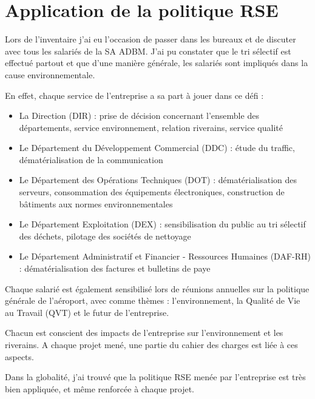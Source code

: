 \section{Application de la politique RSE}

Lors de l'inventaire j'ai eu l'occasion de passer dans les bureaux et de discuter avec tous les salariés de la SA ADBM. J'ai pu constater que le tri sélectif est effectué partout et que d'une manière générale, les salariés sont impliqués dans la cause environnementale.\newline

En effet, chaque service de l'entreprise a sa part à jouer dans ce défi :

\begin{itemize}
    \item La Direction (DIR) : prise de décision concernant l'ensemble des départements, service environnement, relation riverains, service qualité
    \item Le Département du Développement Commercial (DDC) : étude du traffic, dématérialisation de la communication
    \item Le Département des Opérations Techniques (DOT) : dématérialisation des serveurs, consommation des équipements électroniques, construction de bâtiments aux normes environnementales
    \item Le Département Exploitation (DEX) : sensibilisation du public au tri sélectif des déchets, pilotage des sociétés de nettoyage
    \item Le Département Administratif et Financier - Ressources Humaines (DAF-RH) : dématérialisation des factures et bulletins de paye\newline
\end{itemize}

Chaque salarié est également sensibilisé lors de réunions annuelles sur la politique générale de l'aéroport, avec comme thèmes : l'environnement, la Qualité de Vie au Travail (QVT) et le futur de l'entreprise.

Chacun est conscient des impacts de l'entreprise sur l'environnement et les riverains. A chaque projet mené, une partie du cahier des charges est liée à ces aspects.\newline

Dans la globalité, j’ai trouvé que la politique RSE menée par l’entreprise est très bien appliquée, et même renforcée à chaque projet.
